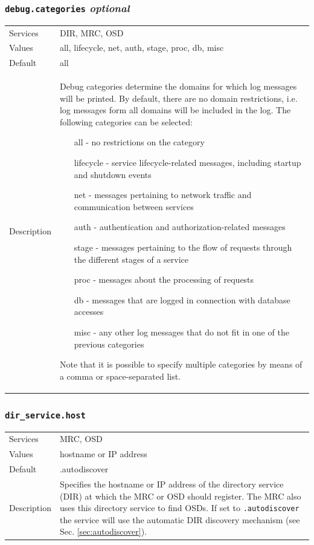 \documentclass[a4paper,10pt]{book}
\begin{document}
\subsubsection{\texttt{debug.categories} \textit{optional}}
\begin{tabular}{lp{10cm}}
 Services & DIR, MRC, OSD\\
 Values   & all, lifecycle, net, auth, stage, proc, db, misc \\
 Default  & all \\
 Description & Debug categories determine the domains for which log messages will be printed. By default, there are no domain restrictions, i.e. log messages form all domains will be included in the log. The following categories can be selected:
\begin{itemize}
 \item[all -] no restrictions on the category
 \item[lifecycle -] service lifecycle-related messages, including startup and shutdown events
 \item[net -] messages pertaining to network traffic and communication between services
 \item[auth -] authentication and authorization-related messages
 \item[stage -] messages pertaining to the flow of requests through the different stages of a service
 \item[proc -] messages about the processing of requests
 \item[db -] messages that are logged in connection with database accesses
 \item[misc -] any other log messages that do not fit in one of the previous categories
\end{itemize}
Note that it is possible to specify multiple categories by means of a comma or space-separated list.
\end{tabular}

\subsubsection{\texttt{dir\_service.host}}
\begin{tabular}{lp{10cm}}
 Services & MRC, OSD\\
 Values   & hostname or IP address \\
 Default  & .autodiscover \\
 Description & Specifies the hostname or IP address of the directory service (DIR) at which the MRC or OSD should register. The MRC also uses this directory service to find OSDs. If set to \texttt{.autodiscover} the service will use the automatic DIR discovery mechanism (see Sec. \ref{sec:autodiscover}).
\end{tabular}
\end{document}
